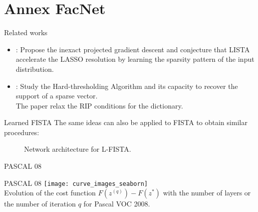 \documentclass[defense.tex]{subfiles}
\begin{document}

\section{Annex FacNet}

\begin{frame}{Related works}

\begin{itemize}\itemsep2em
	\item \cite{Giryes2016}: Propose the inexact projected gradient descent and conjecture that LISTA accelerate the LASSO resolution by learning the sparsity pattern of the input distribution.
	\item \cite{xin2016maximal}: Study the Hard-thresholding Algorithm and its
	capacity to recover the support of a sparse vector.\\
	The paper relax the RIP conditions for the dictionary.
\end{itemize}
	
\end{frame}


\begin{frame}{Learned FISTA}
The same ideas can also be applied to FISTA to obtain similar procedures:
\begin{figure}[t]
    \centering
    \label{fig:ista}
    \caption{Network architecture for L-FISTA.}
\end{figure}
\end{frame}


\begin{frame}{PASCAL 08}

	
\end{frame}
\begin{frame}[noframenumbering]{PASCAL 08}
    \centering
    \texttt{[image: curve\_images\_seaborn]}\\
     Evolution of the cost function $F(z^{(q)})-F(z^*)$ with the number of layers or the number of iteration $q$ for Pascal VOC 2008.
\end{frame}
\end{document}
